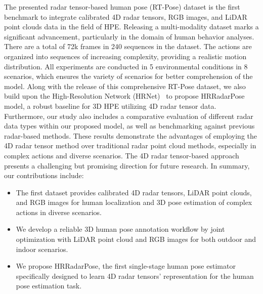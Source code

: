 The presented radar tensor-based human pose (RT-Pose) dataset is the first benchmark to integrate calibrated 4D radar tensors, RGB images, and LiDAR point clouds data in the field of HPE. Releasing a multi-modality dataset marks a significant advancement, particularly in the domain of human behavior analyses. There are 
a total of 72k frames in 240 sequences in the dataset. The actions are organized into sequences of increasing complexity, providing a realistic motion distribution. All experiments are conducted in 5 environmental conditions in 8 scenarios, which ensures the variety of scenarios for better comprehension of the model. Along with the release of this comprehensive RT-Pose dataset, we also build upon the High-Resolution Network (HRNet)~\cite{wang2020deep} to propose  HRRadarPose model, a robust baseline for 3D HPE utilizing 4D radar tensor data. 
Furthermore, our study also includes a comparative evaluation of different radar data types within our proposed model, as well as benchmarking against previous radar-based methods. These results demonstrate the advantages of employing the 4D radar tensor method over traditional radar point cloud methods, especially in complex actions and diverse scenarios. The 4D radar tensor-based approach presents a challenging but promising direction for future research. In summary, our contributions include:
\begin{itemize}
    \item The first dataset provides calibrated 4D radar tensors, LiDAR point clouds, and RGB images for human localization and 3D pose estimation of complex actions in diverse scenarios.
    \item We develop a reliable 3D human pose annotation workflow by joint optimization with LiDAR point cloud and RGB images for both outdoor and indoor scenarios.
    \item We propose HRRadarPose, the first single-stage human pose estimator specifically designed to learn 4D radar tensors' representation for the human pose estimation task.

\end{itemize}


